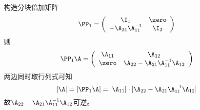 \begin{frame}\ft{\secname}
\begin{jie}
  构造分块倍加矩阵
  $$
  \PP_1 = \left(
    \begin{array}{cc}
      \I_1 & \zero\\
      -\A_{21}\A_{11}^{-1} & \I_2
    \end{array}
  \right)
  $$
  则$$
  \PP_1\A = \left(
    \begin{array}{cc}
      \A_{11} & \A_{12} \\
      \zero & \A_{22}-\A_{21}\A_{11}^{-1}\A_{12}
    \end{array}
  \right)
  $$
  两边同时取行列式可知
  $$
  |\A| = |\PP_1\A| = |\A_{11}|\cdot |\A_{22}-\A_{21}\A_{11}^{-1}\A_{12}|
  $$
  故$\A_{22}-\A_{21}\A_{11}^{-1}\A_{12}$可逆。
\end{jie}
\end{frame}

